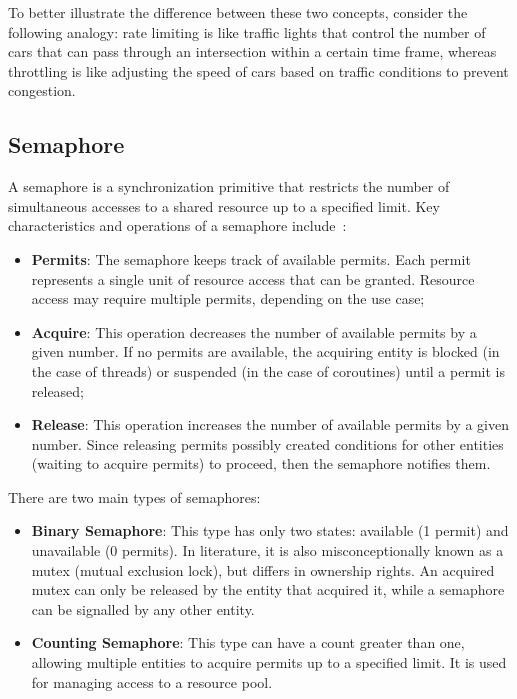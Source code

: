 To better illustrate the difference between these two concepts, consider the following analogy: rate limiting is like traffic lights that control the number of cars that can pass through an intersection within a certain time frame,
whereas throttling is like adjusting the speed of cars based on traffic conditions to prevent congestion.

\subsection{Semaphore}\label{subsec:rate-limiter-semaphore}

A semaphore is a synchronization primitive that restricts the number of simultaneous accesses to a shared resource
up to a specified limit.
Key characteristics and operations of a semaphore include~\cite{java-semaphore, oracle-multithreaded-programming-guide}:

\begin{itemize}
    \item \textbf{Permits}: The semaphore keeps track of available permits.
    Each permit represents a single unit of resource access that can be granted.
    Resource access may require multiple permits, depending on the use case;
    \item \textbf{Acquire}: This operation decreases the number of available permits by a given number.
    If no permits are available, the acquiring entity is blocked (in the case of threads) or suspended (in the case of coroutines) until a permit is released;
    \item \textbf{Release}: This operation increases the number of available permits by a given number.
    Since releasing permits possibly created conditions for other entities (waiting to acquire permits) to proceed, then the semaphore notifies them.
\end{itemize}

There are two main types of semaphores:
\begin{itemize}
    \item \textbf{Binary Semaphore}:
    This type has only two states: available (1 permit) and unavailable (0 permits).
    In literature, it is also misconceptionally known as a mutex (mutual exclusion lock),
    but differs in ownership rights.
    An acquired mutex can only be released by the entity that acquired it, while a semaphore can be signalled by any other entity.
    \item \textbf{Counting Semaphore}: This type can have a count greater than one, allowing multiple entities to acquire permits up to a specified limit.
    It is used for managing access to a resource pool.
\end{itemize}

